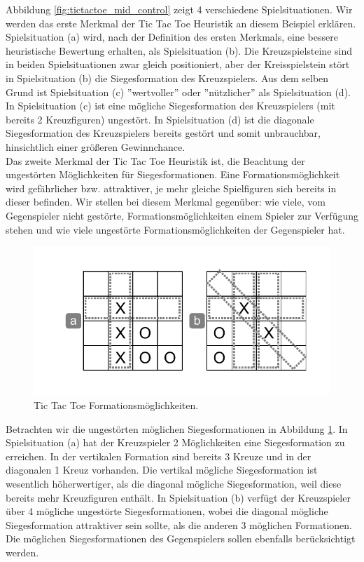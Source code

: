 Abbildung \ref{fig:tictactoe_mid_control} zeigt 4 verschiedene Spielsituationen. Wir werden das erste Merkmal der Tic Tac Toe Heuristik an diesem Beispiel erklären. Spielsituation (a) wird, nach der Definition des ersten Merkmals, eine bessere heuristische Bewertung erhalten, als Spielsituation (b). Die Kreuzspielsteine sind in beiden Spielsituationen zwar gleich positioniert, aber der Kreisspielstein stört in Spielsituation (b) die Siegesformation des Kreuzspielers. Aus dem selben Grund ist Spielsituation (c) ''wertvoller'' oder ''nützlicher'' als Spielsituation (d). In Spielsituation (c) ist eine mögliche Siegesformation des Kreuzspielers (mit bereits 2 Kreuzfiguren) ungestört. In Spielsituation (d) ist die diagonale Siegesformation des Kreuzspielers bereits gestört und somit unbrauchbar, hinsichtlich einer größeren Gewinnchance. \\

Das zweite Merkmal der Tic Tac Toe Heuristik ist, die Beachtung der ungestörten Möglichkeiten für Siegesformationen. Eine Formationsmöglichkeit wird gefährlicher bzw. attraktiver, je mehr gleiche Spielfiguren sich bereits in dieser befinden. Wir stellen bei diesem Merkmal gegenüber: wie viele, vom Gegenspieler nicht gestörte, Formationsmöglichkeiten  einem Spieler zur Verfügung stehen und wie viele ungestörte Formationsmöglichkeiten der Gegenspieler hat. \\

\begin{figure}[!htbp]
  \centering
  \includegraphics[scale = 0.7]{inhalt/abbildungen/tictactoe_formations.pdf}
  \caption{Tic Tac Toe Formationsmöglichkeiten.}
  \label{fig:tictactoe_formations}
\end{figure}

Betrachten wir die ungestörten möglichen Siegesformationen in Abbildung \ref{fig:tictactoe_formations}. In Spielsituation (a) hat der Kreuzspieler 2 Möglichkeiten eine Siegesformation zu erreichen. In der vertikalen Formation sind bereits 3 Kreuze und in der diagonalen 1 Kreuz vorhanden. Die vertikal mögliche Siegesformation ist wesentlich höherwertiger, als die diagonal mögliche Siegesformation, weil diese bereits mehr Kreuzfiguren enthält. In Spielsituation (b) verfügt der Kreuzspieler über 4 mögliche ungestörte Siegesformationen, wobei die diagonal mögliche Siegesformation attraktiver sein sollte, als die anderen 3 möglichen Formationen. Die möglichen Siegesformationen des Gegenspielers sollen ebenfalls berücksichtigt werden.

